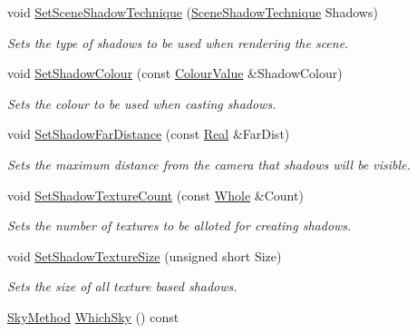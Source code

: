 \begin{DoxyCompactItemize}
void \hyperlink{classphys_1_1SceneManager_a620405e97c1ff656dc09524e4c1d1b4b}{SetSceneShadowTechnique} (\hyperlink{classphys_1_1SceneManager_a427f1bbb52c11ad07352ae01d8b3c746}{SceneShadowTechnique} Shadows)
\begin{DoxyCompactList}\small\item\em Sets the type of shadows to be used when rendering the scene. \item\end{DoxyCompactList}\item 
void \hyperlink{classphys_1_1SceneManager_a5fae70a91407ed773541025f93c52342}{SetShadowColour} (const \hyperlink{classphys_1_1ColourValue}{ColourValue} \&ShadowColour)
\begin{DoxyCompactList}\small\item\em Sets the colour to be used when casting shadows. \item\end{DoxyCompactList}\item 
void \hyperlink{classphys_1_1SceneManager_a124396e75cc26b400f08474a124b3fb3}{SetShadowFarDistance} (const \hyperlink{namespacephys_af7eb897198d265b8e868f45240230d5f}{Real} \&FarDist)
\begin{DoxyCompactList}\small\item\em Sets the maximum distance from the camera that shadows will be visible. \item\end{DoxyCompactList}\item 
void \hyperlink{classphys_1_1SceneManager_a6e09079b87f29fd3c7b7716f88d5081f}{SetShadowTextureCount} (const \hyperlink{namespacephys_a460f6bc24c8dd347b05e0366ae34f34a}{Whole} \&Count)
\begin{DoxyCompactList}\small\item\em Sets the number of textures to be alloted for creating shadows. \item\end{DoxyCompactList}\item 
void \hyperlink{classphys_1_1SceneManager_ab7022066631b9871f8d6e4da6aaa45ed}{SetShadowTextureSize} (unsigned short Size)
\begin{DoxyCompactList}\small\item\em Sets the size of all texture based shadows. \item\end{DoxyCompactList}\item 
\hyperlink{classphys_1_1SceneManager_a91dd086aabaab926d070c65fc14828d6}{SkyMethod} \hyperlink{classphys_1_1SceneManager_a39155e9eaa52789884fcc54d93f8cf3a}{WhichSky} () const 

\end{DoxyCompactItemize}
